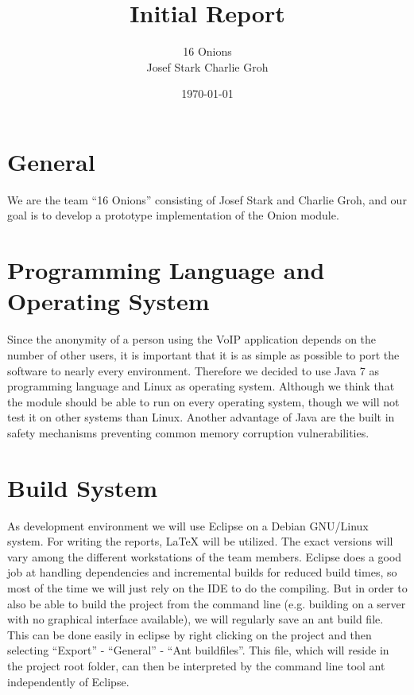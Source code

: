 \documentclass{article}
\begin{document}
\title{\Huge Initial Report \normalsize}
\date{\today}
\author{\LARGE 16 Onions \normalsize \\[5pt] Josef Stark \hspace{20pt} Charlie Groh}
\maketitle
\let\thefootnote\relax{}

\section{General}
We are the team ``16 Onions'' consisting of Josef Stark and Charlie Groh,
and our goal is to develop a prototype implementation of the Onion module.

\section{Programming Language and Operating System}
Since the anonymity of a person using the VoIP application depends on the
number of other users, it is important that it is as simple as possible to port
the software to nearly every environment. Therefore we decided to use Java 7
as programming language and Linux as operating system. Although we think that
the module should be able to run on every operating system, though we will not
test it on other systems than Linux. Another advantage of Java are the built in
safety mechanisms preventing common memory corruption vulnerabilities.

\section{Build System}
As development environment we will use Eclipse on a Debian GNU/Linux system. For
writing the reports, LaTeX will be utilized. The exact versions will vary among
the different workstations of the team members.
Eclipse does a good job at handling dependencies and incremental builds for reduced build times, so most of the time we will just rely on the IDE to do the compiling. But in order to also be able to build the project from the command line (e.g. building on a server with no graphical interface available), we will regularly save an ant build file. This can be done easily in eclipse by right clicking on the project and then selecting ``Export'' - ``General'' - ``Ant buildfiles''. This file, which will reside in the project root folder, can then be interpreted by the command line tool ant independently of Eclipse.
\end{document}
